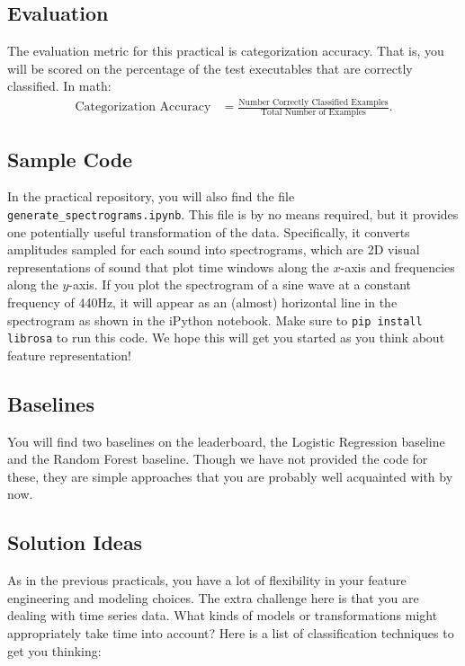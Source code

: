 \documentclass[12pt]{article}
\begin{document}
\subsection*{Evaluation}
The evaluation metric for this practical is categorization accuracy. That is, you will be scored on the percentage of the test executables that are correctly classified. In math: 
\begin{align*}
    \text{Categorization Accuracy} &= \frac{\text{Number Correctly Classified Examples}}{\text{Total Number of Examples}}.
\end{align*}

\subsection*{Sample Code}
In the practical repository, you will also find the file \verb|generate_spectrograms.ipynb|. This file is by no means required, but it provides one potentially useful transformation of the data. Specifically, it converts amplitudes sampled for each sound into spectrograms, which are 2D visual representations of sound that plot time windows along the $x$-axis and frequencies along the $y$-axis. If you plot the spectrogram of a sine wave at a constant frequency of 440Hz, it will appear as an (almost) horizontal line in the spectrogram as shown in the iPython notebook. Make sure to \texttt{pip install librosa} to run this code. We hope this will get you started as you think about feature representation!

\subsection*{Baselines}
You will find two baselines on the leaderboard, the Logistic Regression baseline and the Random Forest baseline. Though we have not provided the code for these, they are simple approaches that you are probably well acquainted with by now.

\subsection*{Solution Ideas}
As in the previous practicals, you have a lot of flexibility in your feature engineering and modeling choices. The extra challenge here is that you are dealing with time series data. What kinds of models or transformations might appropriately take time into account? Here is a list of classification techniques to get you thinking:
\end{document}

